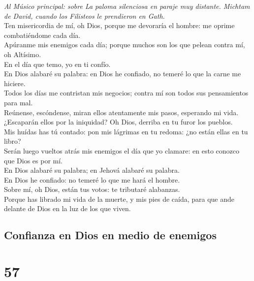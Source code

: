  \emph{Al Músico principal: sobre La paloma silenciosa en
paraje muy distante. Michtam de David, cuando los Filisteos le
prendieron en Gath.}\\
Ten misericordia de mí, oh Dios, porque me devoraría el hombre: me
oprime combatiéndome cada día.\\
 Apúranme mis enemigos cada día; porque muchos son los que
pelean contra mí, oh Altísimo.\\
 En el día que temo, yo en ti confío.\\
 En Dios alabaré su palabra: en Dios he confiado, no temeré
lo que la carne me hiciere.\\
 Todos los días me contristan mis negocios; contra mí son
todos sus pensamientos para mal.\\
 Reúnense, escóndense, miran ellos atentamente mis pasos,
esperando mi vida.\\
 ¿Escaparán ellos por la iniquidad? Oh Dios, derriba en tu
furor los pueblos.\\
 Mis huídas has tú contado: pon mis lágrimas en tu redoma:
¿no están ellas en tu libro?\\
 Serán luego vueltos atrás mis enemigos el día que yo
clamare: en esto conozco que Dios es por mí.\\
 En Dios alabaré su palabra; en Jehová alabaré su
palabra.\\
 En Dios he confiado: no temeré lo que me hará el hombre.\\
 Sobre mí, oh Dios, están tus votos: te tributaré
alabanzas.\\
 Porque has librado mi vida de la muerte, y mis pies de
caída, para que ande delante de Dios en la luz de los que viven.

\hypertarget{confianza-en-dios-en-medio-de-enemigos}{%
\subsection{Confianza en Dios en medio de
enemigos}\label{confianza-en-dios-en-medio-de-enemigos}}

\hypertarget{section-56}{%
\section{57}\label{section-56}}

